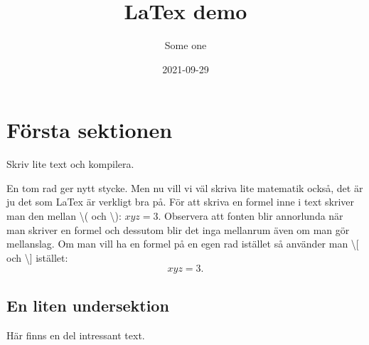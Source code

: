 \documentclass{article}
\title{LaTex demo}
\author{Some one}
\date{2021-09-29}
\begin{document}
\maketitle


\section{Första sektionen}

Skriv lite text och kompilera.

En tom rad ger nytt stycke. Men nu vill vi väl skriva lite matematik också,
det är ju det som LaTex är verkligt bra på. För att skriva en formel inne i text
skriver man den mellan \textbackslash( och \textbackslash): \( x y z=3 \). Observera
att fonten blir annorlunda när man skriver en formel och dessutom blir det 
inga mellanrum även om man gör mellanslag. Om man vill ha en formel på en egen
rad istället så använder man  \textbackslash [ och \textbackslash ] istället:
\[
x y z = 3.
\]

\subsection{En liten undersektion}
Här finns en del intressant text.


\tableofcontents
\end{document}
